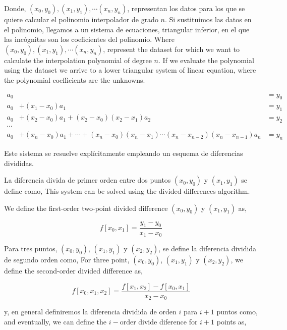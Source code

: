 \begin{paracol}{2}
Donde, $(x_0, y_0), (x_1,y_1), \cdots (x_n, y_n)$, representan los datos para los que se quiere calcular el polinomio interpolador de grado $n$. Si sustituimos las datos en el polinomio, llegamos a un sistema de ecuaciones, triangular inferior, en el que las incógnitas son los coeficientes del polinomio.
\switchcolumn
Where $(x_0, y_0), (x_1,y_1), \cdots (x_n, y_n)$, represent the dataset for which we want to calculate the interpolation polynomial of degree $n$. If we evaluate the polynomial using the dataset we arrive to a lower triangular system of linear equation, where the polynomial coefficients are the unknowns.    
\end{paracol}
\begin{align*}
a_0&&=y_0\\
a_0&+(x_1-x_0)a_1&=y_1\\
a_0&+(x_2-x_0)a_1+(x_2-x_0)(x_2-x_1)a_2&=y_2\\
\cdots\\
a_0&+(x_n-x_0)a_1+\cdots+(x_n-x_0)(x_n-x_1)\cdots (x_n-x_{n-2})(x_n-x_{n-1})a_n&=y_n
\end{align*}
\begin{paracol}{2}
Este sistema se resuelve explícitamente empleando un esquema de diferencias divididas. 

La diferencia divida de primer orden entre dos puntos $(x_0,y_0)$ y $(x_1,y_1)$ se define como,
\switchcolumn
This system can be solved using the divided differences algorithm.

We define the first-order two-point divided difference $(x_0,y_0)$ y $(x_1,y_1)$ as, 
\end{paracol}
\begin{equation*}
f\left[x_0,x_1\right]=\frac{y_1-y_0}{x_1-x_0}
\end{equation*}														
\begin{paracol}{2}
Para tres puntos, $(x_0,y_0)$, $(x_1,y_1)$ y $(x_2,y_2)$, se define la diferencia dividida de segundo orden como,  
\switchcolumn
For three point, $(x_0,y_0)$, $(x_1,y_1)$ y $(x_2,y_2)$, we define the second-order divided  difference as, 
\end{paracol}
\begin{equation*}
f\left[x_0,x_1,x_2\right]=\frac{f\left[x_1,x_2\right]-f\left[x_0,x_1\right]}{x_2-x_0}
\end{equation*}
\begin{paracol}{2}
y, en general definiremos la diferencia dividida de orden $i$ para $i+1$ puntos como,
\switchcolumn
and eventually, we can define the $i-\text{order}$ divide diference for $i+1$ points as,
\end{paracol}

